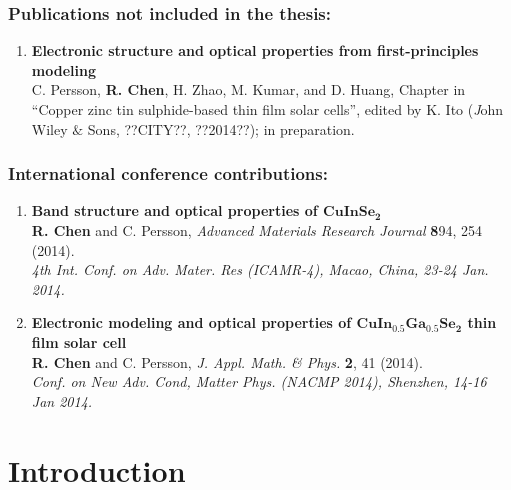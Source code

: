 \documentclass[a4paper, 12pt, titlepage,oneside,drop]{kthesis}
\begin{document}
\subsection*{Publications not included in the thesis:}
\begin{enumerate}
\renewcommand{\labelenumi}{\Roman{enumi}}
\setcounter{enumi}{3}


\item{}\textbf{Electronic structure and optical properties from first-principles modeling} \\
C. Persson, \textbf{R. Chen}, H. Zhao, M. Kumar, and D. Huang, Chapter in “Copper zinc tin sulphide-based thin film solar cells”,
edited by K. Ito ({\textit John Wiley $\&$ Sons}, ??CITY??, ??2014??); in preparation.


\end{enumerate}

\subsection*{International conference contributions:}
\begin{enumerate}
\renewcommand{\labelenumi}{\Roman{enumi}}
\setcounter{enumi}{4}

\item{} \textbf{Band structure and optical properties of $\mathbf {CuInSe_2}$}
\\ \textbf{R. Chen} and C. Persson, 
\textit{Advanced Materials Research Journal} {\textbf 894}, 254 (2014). \\
\textit{4th Int. Conf. on Adv. Mater. Res (ICAMR-4), Macao, China, 23-24 Jan. 2014.}


\item{} \textbf{Electronic modeling and optical properties of $\mathbf{CuIn_{0.5}Ga_{0.5}Se_2}$ thin film solar cell}
\\ \textbf{R. Chen} and C. Persson,
\textit{J. Appl. Math. \& Phys.} {\textbf 2}, 41 (2014). \\
\textit{Conf. on New Adv. Cond, Matter Phys. (NACMP 2014), Shenzhen, 14-16 Jan 2014.}

\end{enumerate}

\newpage
\setcounter{page}{7}
\setcounter{secnumdepth}{3}
\setcounter{tocdepth}{3}
\tableofcontents

\newpage
{}
\chapter{Introduction}
\end{document}
